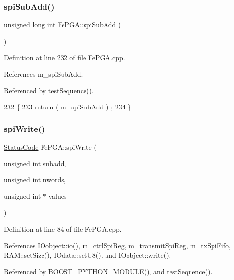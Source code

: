 \subsubsection{\texorpdfstring{spi\+Sub\+Add()}{spiSubAdd()}}
{\footnotesize\ttfamily unsigned long int Fe\+P\+G\+A\+::spi\+Sub\+Add (\begin{DoxyParamCaption}{ }\end{DoxyParamCaption})}



Definition at line 232 of file Fe\+P\+G\+A.\+cpp.



References m\+\_\+spi\+Sub\+Add.



Referenced by test\+Sequence().


\begin{DoxyCode}
232                                   \{
233   \textcolor{keywordflow}{return} ( \hyperlink{classFePGA_a4f2f5d175aeb6dcaf497f81d2f075411}{m\_spiSubAdd} ) ;
234 \}
\end{DoxyCode}
\mbox{\label{classFePGA_ac3e8b10fc267b44fef1e651cab77d2ab}} 
\subsubsection{\texorpdfstring{spi\+Write()}{spiWrite()}\hspace{0.1cm}{\footnotesize\ttfamily [1/3]}}
{\footnotesize\ttfamily \hyperlink{classStatusCode}{Status\+Code} Fe\+P\+G\+A\+::spi\+Write (\begin{DoxyParamCaption}\item[{unsigned int}]{subadd,  }\item[{unsigned int}]{nwords,  }\item[{unsigned int $\ast$}]{values }\end{DoxyParamCaption})}



Definition at line 84 of file Fe\+P\+G\+A.\+cpp.



References I\+Oobject\+::io(), m\+\_\+ctrl\+Spi\+Reg, m\+\_\+transmit\+Spi\+Reg, m\+\_\+tx\+Spi\+Fifo, R\+A\+M\+::set\+Size(), I\+Odata\+::set\+U8(), and I\+Oobject\+::write().



Referenced by B\+O\+O\+S\+T\+\_\+\+P\+Y\+T\+H\+O\+N\+\_\+\+M\+O\+D\+U\+L\+E(), and test\+Sequence().



